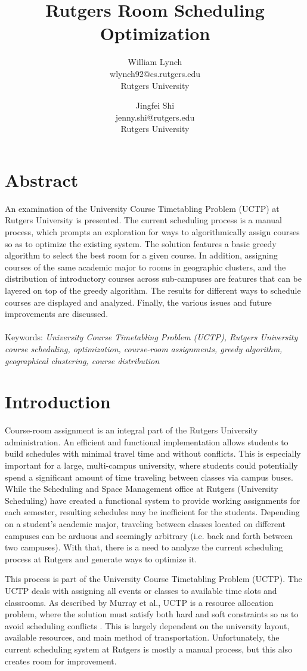 \documentclass[12pt]{article}
\title{Rutgers Room Scheduling Optimization}
\author {William Lynch \\ wlynch92@cs.rutgers.edu \\ Rutgers University
	\and Jingfei Shi \\ jenny.shi@rutgers.edu \\ Rutgers University
}
\begin{document}
\maketitle
\section{Abstract}
An examination of the University Course Timetabling Problem (UCTP) at Rutgers
University is presented. The current scheduling process is a manual process,
which prompts an exploration for ways to algorithmically assign courses so as
to optimize the existing system. The solution features a basic greedy algorithm
to select the best room for a given course. In addition, assigning courses of
the same academic major to rooms in geographic clusters, and the distribution
of introductory courses across sub-campuses are features that can be layered on
top of the greedy algorithm. The results for different ways to schedule courses
are displayed and analyzed. Finally, the various issues and future improvements
are discussed.
\\\\
Keywords: \emph{University Course Timetabling Problem (UCTP), Rutgers University
course scheduling, optimization, course-room assignments, greedy algorithm,
geographical clustering, course distribution}

\section{Introduction}
	Course-room assignment is an integral part of the Rutgers University
	administration. An efficient and functional implementation allows students to
	build schedules with minimal travel time and without conflicts. This is
	especially important for a large, multi-campus university, where students could
	potentially spend a significant amount of time traveling between classes via
	campus buses. While the Scheduling and Space Management office at Rutgers
	(University Scheduling) have created a functional system to provide working
	assignments for each semester, resulting schedules may be inefficient for the
	students. Depending on a student's academic major, traveling between classes
	located on different campuses can be arduous and seemingly arbitrary (i.e. back
	and forth between two campuses). With that, there is a need to analyze the
	current scheduling process at Rutgers and generate ways to optimize it.

	This process is part of the University Course Timetabling Problem (UCTP). The
	UCTP deals with assigning all events or classes to available time slots and
	classrooms. As described by Murray et al., UCTP is a resource allocation
	problem, where the solution must satisfy both hard and soft constraints so as
	to avoid scheduling conflicts \cite{citation1}. This is largely dependent on the university
	layout, available resources, and main method of transportation. Unfortunately,
	the current scheduling system at Rutgers is mostly a manual process, but this
	also creates room for improvement. 
\end{document}
